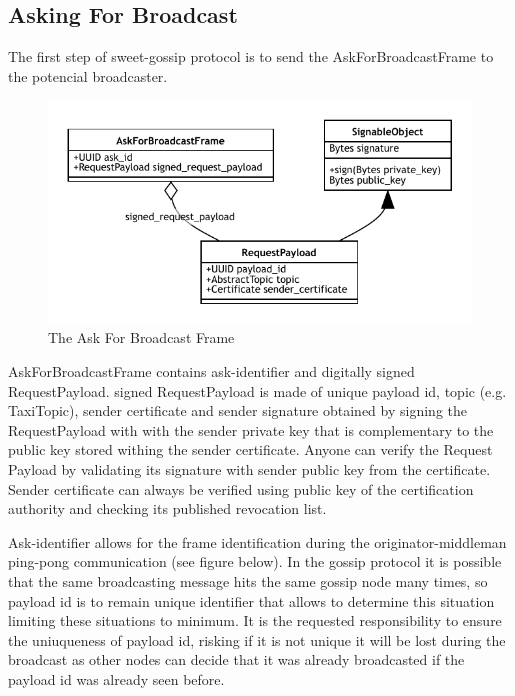 \documentclass{article}
\begin{document}
\subsection{Asking For Broadcast}
The first step of sweet-gossip protocol is to send the AskForBroadcastFrame to the potencial broadcaster.

\begin{figure}
	\centering
	\includegraphics[scale=1.0]{AskForBroadcast.pdf}
	\caption{The Ask For Broadcast Frame}
	\label{fig:fr:askforbroadcast}
\end{figure}

AskForBroadcastFrame contains ask-identifier and digitally signed RequestPayload. signed RequestPayload is made of unique payload id, topic (e.g. TaxiTopic), sender certificate and sender signature obtained by signing the RequestPayload with with the sender private key that is complementary to the public key stored withing the sender certificate. Anyone can verify the Request Payload by validating its signature with sender public key from the certificate. Sender certificate can always be verified using  public key of the certification authority and checking its published revocation list.

Ask-identifier allows for the frame identification during the originator-middleman ping-pong communication (see figure below). In the gossip protocol it is possible that the same broadcasting message hits the same gossip node many times, so payload id is to remain unique identifier that allows to determine this situation limiting these situations to minimum. It is the requested responsibility to ensure the uniuqueness of payload id, risking if it is not unique it will be lost during the broadcast as other nodes can decide that it was already broadcasted if the payload id was already seen before.
\end{document}

